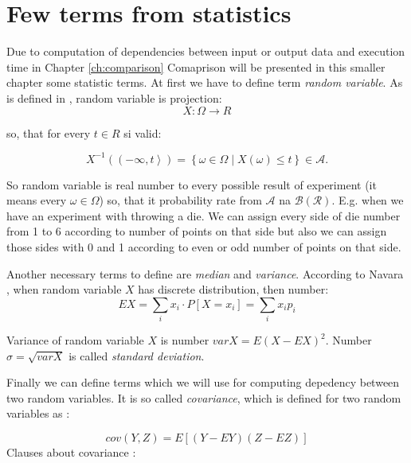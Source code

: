 \documentclass[11pt,twoside,a4paper]{book}
\begin{document}
\chapter{Few terms from statistics}
\label{ch:statistics}

Due to computation of dependencies between input or output data and execution
time in Chapter \ref{ch:comparison} Comaprison will be presented in this smaller
chapter some statistic terms. At first we have to define term \textit{random
variable}. As is defined in \cite{navara:mvt}, random variable is projection:
$$X:\Omega \rightarrow R$$

so, that for every $t\in R$ si valid:

$$X^{-1}\left(\left(-\infty , t\right>\right) =
\left\{\omega\in\Omega\mid X\left(\omega\right)\leq t \right\} \in
\mathcal{A}.$$

So random variable is  real number to every possible result of
experiment (it means every $\omega\in\Omega$) so, that it 
probability rate from $\mathcal{A}$ na $\mathcal{B\left(R\right)}$. E.g. when we
have an experiment with throwing a die. We can assign every side of die number
from 1 to 6 according to number of points on that side but also we can assign
those sides with 0 and 1 according to even or odd number of points on that side.

Another necessary terms to define are \textit{median} and \textit{variance}.
According to Navara \cite{navara:mvt}, when random variable $X$ has discrete distribution, then
number:
$$EX=\sum_i x_i\cdot P\left[X=x_i\right]=\sum_i x_i p_i$$

Variance of random variable $X$ is number $var X = E(X-EX)^2$. Number $\sigma =
\sqrt{var X}$ is called \textit{standard deviation}.

Finally we can define terms which we will use for computing depedency between
two random variables. It is so called \textit{covariance}, which is defined for two
random variables as \cite{navara:mvt}:

$$cov(Y,Z)=E\left[\left(Y-EY\right)\left(Z-EZ\right)\right]$$
\newpage
Clauses about covariance \cite{kulich:stat}:
\end{document}

